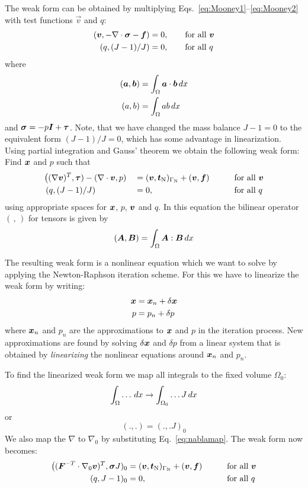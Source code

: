 The weak form can be obtained by multiplying
Eqs.~\eqref{eq:Mooney1}--\eqref{eq:Mooney2}
with test functions $\vec v$ and $q$:
\begin{align*}
 (\boldsymbol{v},-\nabla\cdot\boldsymbol{\sigma} -\boldsymbol{f})&=0,\qquad\text{for all }\boldsymbol{v}\\
  (q,(J-1)/J)& =0,\qquad\text{for all }q
\end{align*}
where
\begin{align*}
   (\boldsymbol{a}, \boldsymbol{b})&=\int_\Omega\boldsymbol{a}\cdot\boldsymbol{b}\,d x\\
   (a,b)&=\int_\Omega a b\,d x
\end{align*}
and $\boldsymbol{\sigma} = -p\boldsymbol{I}+\boldsymbol{\tau}$.
Note, that we have changed the
mass balance $J-1=0$ to the equivalent form $(J-1)/J=0$, which has some
advantage in linearization.
Using partial integration and Gauss'
theorem we obtain the following weak form: 
Find $\boldsymbol{x}$ and $p$ such that
\begin{alignat*}{3}
  &\big((\nabla\boldsymbol{v})^T,\boldsymbol{\tau})
    -(\nabla\cdot\boldsymbol{v},p)&&=(\boldsymbol{v},\boldsymbol{t}_{\text{N}})_{\Gamma_{\text{N}}}+(\boldsymbol{v},\boldsymbol{f})
&\qquad&\text{for all }\boldsymbol{v}\\
  &\,(q,(J-1)/J)&& =0,&\qquad&\text{for all }q
\end{alignat*}
using appropriate spaces for $\boldsymbol{x}$, $p$, $\boldsymbol{v}$ and $q$. In this equation
the bilinear operator $(\,,\,)$ for tensors is given by
\[
   (\boldsymbol{A}, \boldsymbol{B})=\int_\Omega\boldsymbol{A}:\boldsymbol{B}\,d x
\]

The resulting weak form is a nonlinear equation which we want to solve by
applying the Newton-Raphson iteration scheme. For this we have to linearize the
weak form by writing:
\begin{align*}
   \boldsymbol{x} &= \boldsymbol{x}_n + \delta\boldsymbol{x} \\
        p &= p_n + \delta p
\end{align*}
where $\boldsymbol{x}_n$ and $p_n$ are the approximations to $\boldsymbol{x}$ and $p$ in the
iteration process. New approximations are found by solving $\delta\boldsymbol{x}$ and
$\delta p$ from a linear system that is obtained by \emph{linearizing} the
nonlinear equations around $\boldsymbol{x}_n$ and $p_n$. 

To find the linearized weak form we map all integrals to the fixed volume
$\Omega_0$:
\[
  \int_\Omega \ldots \,d x\rightarrow
  \int_{\Omega_0} \ldots J\,d x
\]
or
\[
   (.,.) = (.,. J)_0
\]
We also map the $\nabla$ to $\nabla_0$ by substituting Eq.~\eqref{eq:nablamap}.
The weak form now becomes:
\begin{alignat*}{2}
 \big((\boldsymbol{F}^{-T}\cdot\nabla_0\boldsymbol{v})^T,\boldsymbol{\sigma} J)_0
          &=(\boldsymbol{v},\boldsymbol{t}_{\text{N}})_{\Gamma_{\text{N}}}+(\boldsymbol{v},\boldsymbol{f})
         &\qquad&\text{for all }\boldsymbol{v}\\
  (q,J-1)_0& =0,&\qquad&\text{for all }q
\end{alignat*}

